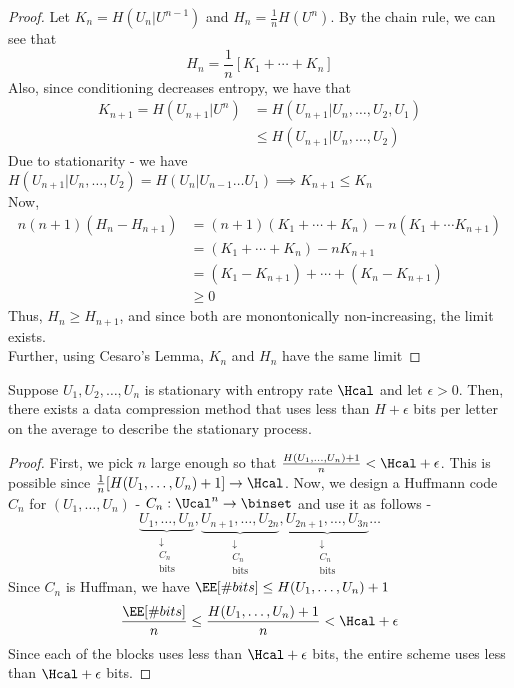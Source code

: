 \begin{proof}
Let $K_n = H(U_n|U^{n-1})$ and $H_n = \frac{1}{n}H(U^n)$. By the chain rule, we can see that
\[H_n = \frac{1}{n} [K_1 + \cdots + K_n] \]
Also, since conditioning decreases entropy, we have that 
\begin{align*}
    K_{n+1} = H(U_{n+1} | U^n) &= H(U_{n+1} | U_{n}, \dots, U_2, U_1) \\
    &\leq H(U_{n+1} | U_n,\dots,U_2)
\end{align*}
Due to stationarity - we have $H(U_{n+1}| U_n, \dots, U_2) = H(U_{n}|U_{n-1} \dots U_1) \implies K_{n+1} \leq K_n$ \\
Now, 
\begin{align*}
    n(n+1) (H_n - H_{n+1}) &= (n+1)(K_1 + \cdots + K_n) - n(K_1 + \cdots K_{n+1}) \\
    &= (K_1 + \cdots + K_n) - nK_{n+1} \\
    &= (K_1 - K_{n+1}) + \cdots + (K_n - K_{n+1}) \\
    &\geq 0
\end{align*}
Thus, $H_n \geq H_{n+1}$, and since both are monontonically non-increasing, the limit exists.\\
Further, using Cesaro's Lemma, $K_n$ and $H_n$ have the same limit
\end{proof}
\begin{theorem}
Suppose $U_1, U_2, \dots, U_n$ is stationary with entropy rate $\Hcal$ and let $\epsilon >0 $. Then, there exists a data compression method that uses less than $H+\epsilon$ bits per letter on the average to describe the stationary process.
\end{theorem}
\begin{proof}
First, we pick $n$ large enough so that $\frac{H(U_1, \dots, U_n) + 1}{n} < \Hcal + \epsilon $. This is possible since $\frac{1}{n} [H(U_1,\dots,U_n) + 1] \to \Hcal$. Now, we design a Huffmann code $C_n$ for $(U_1, \dots, U_n)$ - $C_n: \Ucal^n \to \binset$ and use it as follows - 
\[\underbrace{U_1, \dots, U_n}_{\substack{\downarrow \\ C_n \\ \text{bits}}},\underbrace{U_{n+1}, \dots, U_{2n}}_{\substack{\downarrow \\ C_n \\ \text{bits}}},\underbrace{U_{2n+1}, \dots, U_{3n}}_{\substack{\downarrow \\ C_{n} \\ \text{bits}}} \dots \]
Since $C_n$ is Huffman, we have $\EE[\# bits] \leq H(U_1, \dots, U_n) + 1$ \\
\[\frac{\EE[\# bits]}{n} \leq \frac{H(U_1, \dots, U_n) + 1}{n} < \Hcal + \epsilon \]
Since each of the blocks uses less than $\Hcal + \epsilon$ bits, the entire scheme uses less than $\Hcal + \epsilon$ bits.
\end{proof}
